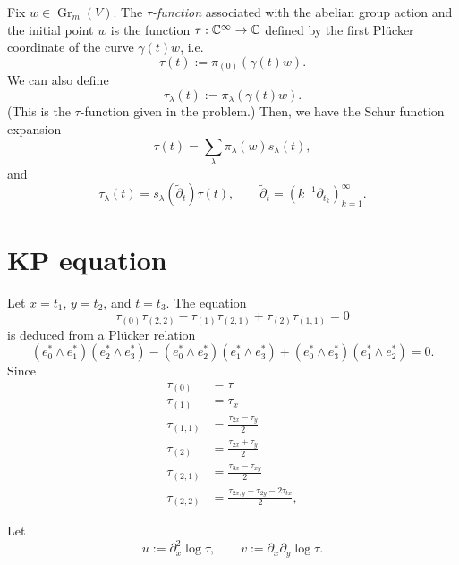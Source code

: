 \documentclass{../../../small}
\newcommand{\Gr}{\operatorname{Gr}}
\begin{document}
Fix $w\in\Gr_m(V)$.
The \emph{$\tau$-function} associated with the abelian group action and the initial point $w$ is the function $\tau:\mathbb{C}^\infty\to\mathbb{C}$ defined by the first Pl\"ucker coordinate of the curve $\gamma(t)w$, i.e.
\[\tau(t):=\pi_{(0)}(\gamma(t)w).\]
We can also define
\[\tau_\lambda(t):=\pi_\lambda(\gamma(t)w).\]
(This is the $\tau$-function given in the problem.)
Then, we have the Schur function expansion
\[\tau(t)=\sum_\lambda\pi_\lambda(w)s_\lambda(t),\]
and
\[\tau_\lambda(t)=s_\lambda(\tilde\partial_t)\tau(t),\qquad\tilde\partial_t=(k^{-1}\partial_{t_k})_{k=1}^\infty.\]



\section{KP equation}

Let $x=t_1$, $y=t_2$, and $t=t_3$.
The equation
\[\tau_{(0)}\tau_{(2,2)}-\tau_{(1)}\tau_{(2,1)}+\tau_{(2)}\tau_{(1,1)}=0\]
is deduced from a Pl\"ucker relation
\[(e_0^*\wedge e_1^*)(e_2^*\wedge e_3^*)-(e_0^*\wedge e_2^*)(e_1^*\wedge e_3^*)+(e_0^*\wedge e_3^*)(e_1^*\wedge e_2^*)=0.\]
Since
\begin{align*}
\tau_{(0)}&=\tau\\
\tau_{(1)}&=\tau_x\\
\tau_{(1,1)}&=\frac{\tau_{2x}-\tau_y}2\\
\tau_{(2)}&=\frac{\tau_{2x}+\tau_y}2\\
\tau_{(2,1)}&=\frac{\tau_{3x}-\tau_{xy}}2\\
\tau_{(2,2)}&=\frac{\tau_{2x,y}+\tau_{2y}-2\tau_{tx}}2,
\end{align*}

Let
\[u:=\partial_x^2\log\tau,\qquad v:=\partial_x\partial_y\log\tau.\]
\end{document}
